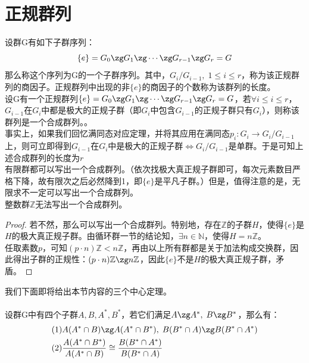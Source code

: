 \section{正规群列}
设群G有如下子群序列：
\[
\{e\}=G_0\zg G_1 \zg \cdots \zg G_{r-1}\zg G_r=G
\]
那么称这个序列为G的一个子群序列。其中，$G_i/G_{i-1},\; 1\leq i\leq r$，称为该正规群列的商因子。正规群列中出现的非$\{e\}$的商因子的个数称为该群列的长度。\\
设G有一个正规群列$\{e\}=G_0\zg G_1 \zg \cdots \zg G_{r-1}\zg G_r=G$，若$\forall i\leq i\leq r$，$G_{i-1}$在$G_i$中都是极大的正规子群（即$G_i$中包含$G_{i-1}$的正规子群只有$G_i$），则称该群列是一个合成群列。。\\
\indent 事实上，如果我们回忆满同态对应定理，并将其应用在满同态$p_i\colon G_i\to G_i/G_{i-1}$上，则可立即得到$G_{i-1}$在$G_i$中是极大的正规子群$\iff G_i/G_{i-1}$是单群。于是可知上述合成群列的长度为$r$\\
有限群都可以写出一个合成群列。（依次找极大真正规子群即可，每次元素数目严格下降，故有限次之后必然降到1，即$\{e\}$是平凡子群。）但是，值得注意的是，无限求不一定可以写出一个合成群列。\\
整数群$\mathbb{Z}$无法写出一个合成群列。
\begin{proof}
若不然，那么可以写出一个合成群列。特别地，存在$\mathbb{Z}$的子群$H$，使得$\{e\}$是$H$的极大真正规子群。由循环群一节的结论知，$\exists n\in \mathbb{N}$，使得$H=n\mathbb{Z}$。\\
\indent 任取素数$p$，可知$(p\cdot n)\mathbb{Z}<n\mathbb{Z}$，再由以上所有群都是关于加法构成交换群，因此得出子群的正规性：$(p\cdot n)\mathbb{Z}\zg n\mathbb{Z}$，因此$\{e\}$不是$H$的极大真正规子群，矛盾。
\end{proof}
我们下面即将给出本节内容的三个中心定理。\\
\\
设群G中有四个子群$A,B,A^*,B^*$，若它们满足$A\zg A^*,\; B\zg B^*$，那么有：
\[
\begin{aligned}
&(1)A(A^* \cap B)\zg A(A^*\cap B^*),\; B(B^*\cap A)\zg B(B^*\cap A^*)\\
&(2)\dfrac{A(A^*\cap B^*)}{A(A^*\cap B)}\cong \dfrac{B(B^*\cap A^*)}{B(B^*\cap A)}
\end{aligned}
\]
